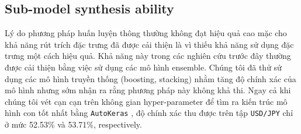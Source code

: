 \documentclass[aps,prb,groupedaddress,twocolumn,showpacs,dvipdfmx,superscriptaddress,pdftex]{revtex4-2}
\begin{document}



\subsection{Sub-model synthesis ability}

Lý do phương pháp huấn luyện thông thường không đạt hiệu quả cao mặc cho khả năng rút trích đặc trưng đã được cải thiện là vì thiếu khả năng sử dụng đặc trưng một cách hiệu quả. Khả năng này trong các nghiên cứu trước đây thường được cải thiện bằng việc sử dụng các mô hình ensemble. Chúng tôi đã thử sử dụng các mô hình truyền thống (boosting, stacking) nhằm tăng độ chính xác của mô hình nhưng sớm nhận ra rằng phương pháp này không khả thi. Ngay cả khi chúng tôi vét cạn cạn trên không gian hyper-parameter để tìm ra kiến trúc mô hình con tốt nhất bằng \verb|AutoKeras| \cite{jin2023autokeras}, độ chính xác thu được trên tập \verb|USD/JPY| chỉ ở mức 52.53\% và 53.71\%, respectively.
\end{document}
